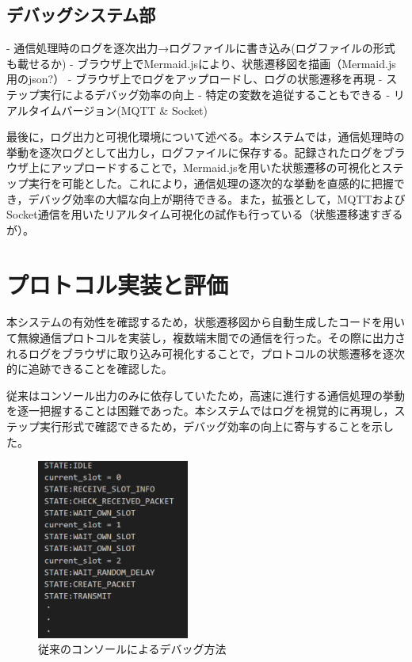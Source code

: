 \documentclass[paper]{ieicej}
\begin{document}
\subsection{デバッグシステム部}
- 通信処理時のログを逐次出力→ログファイルに書き込み(ログファイルの形式も載せるか)
- ブラウザ上でMermaid.jsにより、状態遷移図を描画（Mermaid.js用のjson?）
- ブラウザ上でログをアップロードし、ログの状態遷移を再現
- ステップ実行によるデバッグ効率の向上
- 特定の変数を追従することもできる
- リアルタイムバージョン(MQTT \& Socket)

最後に，ログ出力と可視化環境について述べる。本システムでは，通信処理時の挙動を逐次ログとして出力し，ログファイルに保存する。記録されたログをブラウザ上にアップロードすることで，Mermaid.jsを用いた状態遷移の可視化とステップ実行を可能とした。これにより，通信処理の逐次的な挙動を直感的に把握でき，デバッグ効率の大幅な向上が期待できる。また，拡張として，MQTTおよびSocket通信を用いたリアルタイム可視化の試作も行っている（状態遷移速すぎるが）。

\section{プロトコル実装と評価}
本システムの有効性を確認するため，状態遷移図から自動生成したコードを用いて無線通信プロトコルを実装し，複数端末間での通信を行った。その際に出力されるログをブラウザに取り込み可視化することで，プロトコルの状態遷移を逐次的に追跡できることを確認した。

従来はコンソール出力のみに依存していたため，高速に進行する通信処理の挙動を逐一把握することは困難であった。本システムではログを視覚的に再現し，ステップ実行形式で確認できるため，デバッグ効率の向上に寄与することを示した。
\begin{figure}[tb]
  \centering
  \includegraphics[width=50mm]{./images/old_debug.png}
  \caption{従来のコンソールによるデバッグ方法}
  \label{fig:old-debug}
\end{figure}
\end{document}
